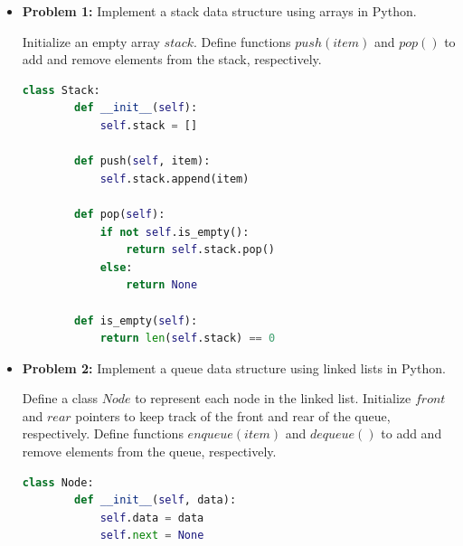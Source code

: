 \documentclass[12pt]{book} %
\begin{document}
\begin{itemize}
    \item \textbf{Problem 1:} Implement a stack data structure using arrays in Python.
    
    \begin{algorithm}[H]
    \caption{Stack Implementation using Arrays}
    \begin{algorithmic}[1]
    \State Initialize an empty array $stack$.
    \State Define functions $push(item)$ and $pop()$ to add and remove elements from the stack, respectively.
    \end{algorithmic}
    \end{algorithm}
    
    \FloatBarrier
    \begin{lstlisting}[language=Python, caption=Stack Implementation in Python using Arrays]
    class Stack:
        def __init__(self):
            self.stack = []
        
        def push(self, item):
            self.stack.append(item)
        
        def pop(self):
            if not self.is_empty():
                return self.stack.pop()
            else:
                return None
                
        def is_empty(self):
            return len(self.stack) == 0
    \end{lstlisting}
    \FloatBarrier

    \item \textbf{Problem 2:} Implement a queue data structure using linked lists in Python.
    
    \begin{algorithm}[H]
    \caption{Queue Implementation using Linked Lists}
    \begin{algorithmic}[1]
    \State Define a class $Node$ to represent each node in the linked list.
    \State Initialize $front$ and $rear$ pointers to keep track of the front and rear of the queue, respectively.
    \State Define functions $enqueue(item)$ and $dequeue()$ to add and remove elements from the queue, respectively.
    \end{algorithmic}
    \end{algorithm}
    
    \FloatBarrier
    \begin{lstlisting}[language=Python, caption=Queue Implementation in Python using Linked Lists]
    class Node:
        def __init__(self, data):
            self.data = data
            self.next = None
            

\end{lstlisting}
\end{itemize}
\end{document}
